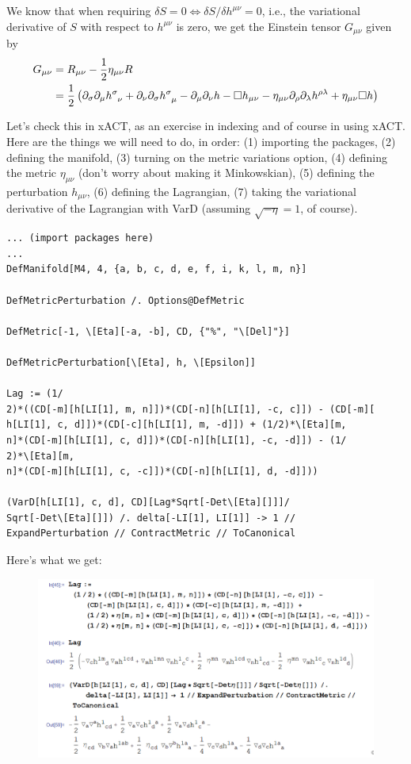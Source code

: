 \documentclass{book}
\theoremstyle{definition}
\newcommand{\p}{\partial}
\newcommand{\f}[2]{\frac{#1}{#2}}
\newcommand{\lp}{\left(}
\newcommand{\rp}{\right)}
\begin{document}
We know that when requiring $\delta S = 0 \iff \delta S / \delta h^{\mu\nu} = 0$, i.e., the variational derivative of $S$ with respect to $h^{\mu\nu}$ is zero, we get the Einstein tensor $G_{\mu\nu}$ given by
\begin{align}
G_{\mu\nu} &= R_{\mu\nu} - \f{1}{2}\eta_{\mu\nu}R \nonumber\\
&= \f{1}{2}\lp  \p_\sigma\p_\mu \tensor{h}{^\sigma_\nu} + \p_\nu \p_\sigma \tensor{h}{^\sigma_\mu}- \p_\mu\p_\nu h - \square h_{\mu\nu} - \eta_{\mu\nu}\p_\rho\p_\lambda h^{\rho\lambda} + \eta_{\mu\nu}\square h  \rp
\end{align}

Let's check this in xACT, as an exercise in indexing and of course in using xACT. Here are the things we will need to do, in order: (1) importing the packages, (2) defining the manifold, (3) turning on the metric variations option, (4) defining the metric $\eta_{\mu\nu}$ (don't worry about making it Minkowskian), (5) defining the perturbation $h_{\mu\nu}$, (6) defining the Lagrangian, (7) taking the variational derivative of the Lagrangian with VarD (assuming $\sqrt{-\eta} = 1$, of course).
\begin{lstlisting}
... (import packages here)
...
DefManifold[M4, 4, {a, b, c, d, e, f, i, k, l, m, n}]

DefMetricPerturbation /. Options@DefMetric

DefMetric[-1, \[Eta][-a, -b], CD, {"%", "\[Del]"}]

DefMetricPerturbation[\[Eta], h, \[Epsilon]]

Lag := (1/
2)*((CD[-m][h[LI[1], m, n]])*(CD[-n][h[LI[1], -c, c]]) - (CD[-m][
h[LI[1], c, d]])*(CD[-c][h[LI[1], m, -d]]) + (1/2)*\[Eta][m, 
n]*(CD[-m][h[LI[1], c, d]])*(CD[-n][h[LI[1], -c, -d]]) - (1/
2)*\[Eta][m, 
n]*(CD[-m][h[LI[1], c, -c]])*(CD[-n][h[LI[1], d, -d]]))

(VarD[h[LI[1], c, d], CD][Lag*Sqrt[-Det\[Eta][]]]/
Sqrt[-Det\[Eta][]]) /. delta[-LI[1], LI[1]] -> 1 // 
ExpandPerturbation // ContractMetric // ToCanonical
\end{lstlisting}
Here's what we get:
\begin{figure}[!htb]
	\includegraphics[scale=0.4]{lag-weak}
\end{figure}
\end{document}
